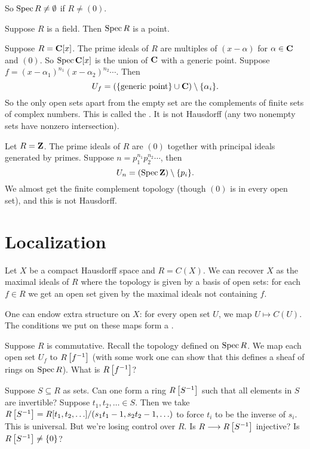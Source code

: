 \documentclass[11pt, oneside,margin=1in]{article}
\begin{document}
So $\operatorname{Spec} R\ne\emptyset$ if $R\ne (0)$. 
\begin{example}Suppose $R$ is a field. Then $\operatorname{Spec} R$ is a point.\end{example}

\begin{example}
Suppose $R = \mathbf C[x]$. The prime ideals of $R$ are multiples of $(x-\alpha)$ for $\alpha\in \mathbf C$ and $(0)$. So $\operatorname{Spec} \mathbf C[x] $ is the union of $\mathbf C$ with a generic point. Suppose $f = (x-\alpha_1)^{n_1} (x-\alpha_2)^{n_2}\cdots$. Then 
$$
U_f = \left(\{ \textrm{generic point} \} \cup \mathbf C\right) \setminus \{ \alpha_i\}.
$$
So the only open sets apart from the empty set are the complements of finite sets of complex numbers. This is called the . It is not Hausdorff (any two nonempty sets have nonzero intersection).
\end{example}
\begin{example}
Let $R=\mathbf Z$. The prime ideals of $R$ are $(0)$ together with principal ideals generated by primes. Suppose $n = p_1^{n_1} p_2^{n_2}\cdots$, then 
$$
U_n = (\operatorname{Spec} \mathbf Z) \setminus \{p_i\}.
$$
We almost get the finite complement topology (though $(0)$ is in every open set), and this is not Hausdorff.
\end{example}

\section{Localization}
Let $X$ be a compact Hausdorff space and $R=C(X)$. We can recover $X$ as the maximal ideals of $R$ where the topology is given by a basis of open sets: for each $f\in R$ we get an open set given by the maximal ideals not containing $f$. 

One can endow extra structure on $X$: for every open set $U$, we map $U\longmapsto C(U)$.
The conditions we put on these maps form a .

Suppose $R$ is commutative. Recall the topology defined on $\operatorname{Spec} R$. We map each open set $U_f$ to $R\left[f^{-1}\right]$ (with some work one can show that this defines a sheaf of rings on $\operatorname{Spec} R$). What is $R\left[f^{-1}\right]$?

Suppose $S\subseteq R$ as sets. Can one form a ring $R\left [S^{-1} \right] $ such that all elements in $S$ are invertible? Suppose $t_1,t_2,\hdots\in S$. Then we take $R\left [S^{-1} \right] = R[t_1,t_2,\hdots] / (s_1t_1-1, s_2t_2-1,\hdots)$ to force $t_i$ to be the inverse of $s_i$. This is universal. But we're losing control over $R$. Is $R\longrightarrow R\left[S^{-1}\right]$ injective? Is $R\left[S^{-1}\right]\ne \{0\}$?
\end{document}
